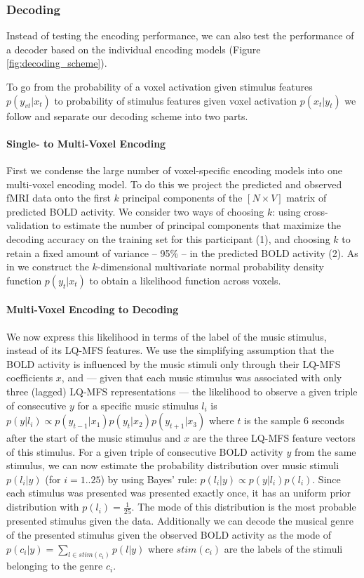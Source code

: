 \subsubsection*{Decoding}

Instead of testing the encoding performance, we can also test the performance
of a decoder based on the individual encoding models \citep{NG11} (Figure
\ref{fig:decoding_scheme}).

To go from the probability of a voxel activation
given stimulus features $p(y_{vt}|x_{t})$ to probability of stimulus features
given voxel activation $p(x_{t}|y_{t})$ we follow \citet{NG09} and separate our
decoding scheme into two parts. 

\paragraph{Single- to Multi-Voxel Encoding}

First we condense the large number of voxel-specific encoding models into one
multi-voxel encoding model.  To do this we project the predicted and observed
f{MRI} data onto the first $k$ principal components of the $[N\times V]$ matrix
of predicted BOLD activity. We consider two ways of choosing $k$: using
cross-validation to estimate the number of principal components
that maximize the decoding accuracy on the training set for this participant
(1), and choosing $k$ to retain a fixed amount of variance -- 95\% -- in the
predicted BOLD activity (2). As in \citet{NG09} we construct the $k$-dimensional multivariate normal
probability density function $p(y_{t}|x_{t})$ to obtain a likelihood function
across voxels. 

\paragraph{Multi-Voxel Encoding to Decoding}

We now express this likelihood in terms of the label of the music stimulus, instead of its LQ-MFS features.  We
use the simplifying assumption that the BOLD activity is influenced by the
music stimuli only through their LQ-MFS coefficients $x$, and --- given that
each music stimulus was associated with only three (lagged) LQ-MFS
representations --- the likelihood to observe a given triple of consecutive $y$
for a specific music stimulus $l_{i}$ is $p(y|l_{i}) \propto
p(y_{t-1}|x_{1})p(y_{t}|x_{2})p(y_{t+1}|x_{3})$ where $t$ is the sample 6
seconds after the start of the music stimulus and $x$ are the three LQ-MFS
feature vectors of this stimulus.  For a given triple of consecutive BOLD
activity $y$ from the same stimulus, we can now estimate the probability
distribution over music stimuli $p(l_{i}|y)$ (for $i=1..25$) by using Bayes'
rule: $p(l_{i}|y) \propto p(y|l_{i})p(l_{i})$.
Since each stimulus was presented was presented exactly once,
it has an uniform prior distribution with $p(l_{i})=\frac{1}{25}$. The mode of
this distribution is the most probable presented stimulus given the data. 
Additionally we can decode the musical genre of the presented stimulus given the observed
BOLD activity as the mode of $p(c_{i}|y) = \sum\nolimits_{l \in
  stim(c_{i})} p(l|y)$ where $stim(c_{i})$ are the labels of the stimuli
  belonging to the genre $c_{i}$. 


